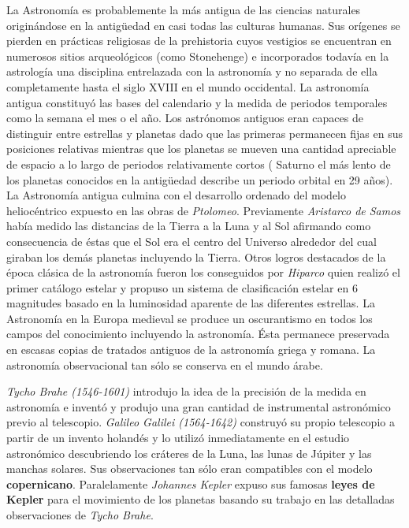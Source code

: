 \bigskip
 La Astronomía es probablemente la más antigua de las ciencias naturales originándose en la antigüedad en casi todas las culturas humanas. Sus orígenes se pierden en prácticas religiosas de la prehistoria cuyos vestigios se encuentran en numerosos sitios arqueológicos (como Stonehenge) e incorporados todavía en la astrología una disciplina entrelazada con la astronomía y no separada de ella completamente hasta el siglo XVIII en el mundo occidental. La astronomía antigua constituyó las bases del calendario y la medida de periodos temporales como la semana el mes o el año. Los astrónomos antiguos eran capaces de distinguir entre estrellas y planetas dado que las primeras permanecen fijas en sus posiciones relativas mientras que los planetas se mueven una cantidad apreciable de espacio a lo largo de periodos relativamente cortos ( Saturno el más lento de los planetas conocidos en la antigüedad describe un periodo orbital en 29 años). La Astronomía antigua culmina con el desarrollo ordenado del modelo heliocéntrico expuesto en las obras de \textit{Ptolomeo}. Previamente \textit{Aristarco de Samos} había medido las distancias de la Tierra a la Luna y al Sol afirmando como consecuencia de éstas que el Sol era el centro del Universo alrededor del cual giraban los demás planetas incluyendo la Tierra. Otros logros destacados de la época clásica de la astronomía fueron los conseguidos por \textit{Hiparco} quien realizó el primer catálogo estelar y propuso un sistema de clasificación estelar en 6 magnitudes basado en la luminosidad aparente de las diferentes estrellas. La Astronomía en la Europa medieval se produce un oscurantismo en todos los campos del conocimiento incluyendo la astronomía. Ésta permanece preservada en escasas copias de tratados antiguos de la astronomía griega y romana. La astronomía observacional tan sólo se conserva en el mundo árabe.\cite{LHDLA}

 \bigskip
 \textit{Tycho Brahe (1546-1601)} introdujo la idea de la precisión de la medida en astronomía e inventó y produjo una gran cantidad de instrumental astronómico previo al telescopio. \textit{Galileo Galilei (1564-1642)} construyó su propio telescopio a partir de un invento holandés y lo utilizó inmediatamente en el estudio astronómico descubriendo los cráteres de la Luna, las lunas de Júpiter y las manchas solares. Sus observaciones tan sólo eran compatibles con el modelo \textbf{copernicano}. Paralelamente \textit{Johannes Kepler} expuso sus famosas \textbf{leyes de Kepler} para el movimiento de los planetas basando su trabajo en las detalladas observaciones de \textit{Tycho Brahe}.

